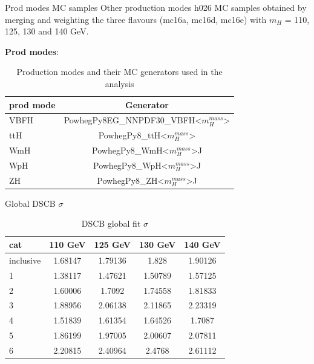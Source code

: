 \documentclass[10pt,UKenglish, leqno, xcolor = dvipsnames]{beamer}
\begin{document}
	\begin{frame}{Prod modes MC samples}
		\vfill
		Other production modes h026 MC samples obtained by merging and weighting the three flavours (mc16a, mc16d, mc16e) with $m_H$ = 110, 125, 130 and 140 GeV.
		
		\vspace{.5cm}
		\textbf{Prod modes}:
		\begin{table}[tbp]
			\centering
			\begin{tabular}{lc}
				\toprule[1.5pt]
				prod mode	& Generator	\\
				\midrule
				VBFH 	& PowhegPy8EG\_NNPDF30\_VBFH<$m_{H}^{mass}$>	\\
				ttH		& PowhegPy8\_ttH<$m_{H}^{mass}$>	\\
				WmH		& PowhegPy8\_WmH<$m_{H}^{mass}$>J	\\
				WpH		& PowhegPy8\_WpH<$m_{H}^{mass}$>J	\\
				ZH 		& PowhegPy8\_ZH<$m_{H}^{mass}$>J	\\
				\bottomrule[1.5pt]
			\end{tabular}
			\caption{Production modes and their MC generators used in the analysis}
		\end{table} 
		\vfill
	\end{frame}

	\begin{frame}{Global DSCB $\sigma$}
		\vfill
		\centering
		\begin{table}[tbp]
			\centering
			\begin{tabular}{lcccc}
				\toprule[1.5pt]
				cat	& 110 GeV	& 125 GeV	& 130 GeV	& 140 GeV	\\
				\midrule
				inclusive & 1.68147 & 1.79136 & 1.828 & 1.90126 \\ 
				1 & 1.38117 & 1.47621 & 1.50789 & 1.57125 \\ 
				2 & 1.60006 & 1.7092 & 1.74558 & 1.81833 \\
				3 & 1.88956 & 2.06138 & 2.11865 & 2.23319 \\ 
				4 & 1.51839 & 1.61354 & 1.64526 & 1.7087 \\ 
				5 & 1.86199 & 1.97005 & 2.00607 & 2.07811 \\ 
				6 & 2.20815 & 2.40964 & 2.4768 & 2.61112 \\ 
				\bottomrule[1.5pt]
			\end{tabular}
			\caption{DSCB global fit $\sigma$}
		\end{table}
		\vfill
	\end{frame}
	
\end{document}
